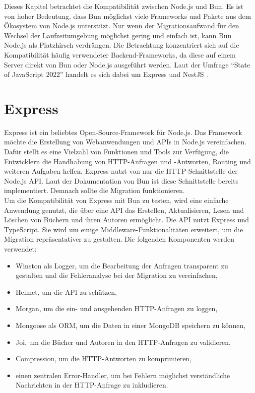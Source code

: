   \label{compabitility}
Dieses Kapitel betrachtet die Kompatibilität zwischen Node.js und Bun. Es ist von hoher Bedeutung, dass Bun möglichst viele Frameworks und Pakete aus dem Ökosystem von Node.js unterstüzt. Nur wenn der Migrationsaufwand für den Wechsel der Laufzeitumgebung möglichst gering und einfach ist, kann Bun Node.js als Platzhirsch verdrängen. Die Betrachtung konzentriert sich auf die Kompatibilität häufig verwendeter Backend-Frameworks, da diese auf einem Server direkt von Bun oder Node.js ausgeführt werden. Laut der Umfrage ``State of JavaScript 2022'' handelt es sich dabei um Express und NestJS \cite{Greif.2022}.

\section{Express} \label{sec:compabitility-newProjects}
Express ist ein beliebtes Open-Source-Framework für Node.js. Das Framework möchte die Erstellung von Webanwendungen und APIs in Node.js vereinfachen. Dafür stellt es eine Vielzahl von Funktionen und Tools zur Verfügung, die Entwicklern die Handhabung von HTTP-Anfragen und -Antworten, Routing und weiteren Aufgaben helfen. Express nutzt von nur die HTTP-Schnittstelle der Node.js API. Laut der Dokumentation von Bun ist diese Schnittstelle bereits implementiert. Demnach sollte die Migration funktionieren.\\

\noindent 
Um die Kompatibilität von Express mit Bun zu testen, wird eine einfache Anwendung genutzt, die über eine API das Erstellen, Aktualisieren, Lesen und Löschen von Büchern und ihren Autoren ermöglicht. Die API nutzt Express und TypeScript. Sie wird um einige Middleware-Funktionalitäten erweitert, um die Migration repräsentativer zu gestalten. Die folgenden Komponenten werden verwendet:
\begin{itemize}
	\item Winston als Logger, um die Bearbeitung der Anfragen transparent zu gestalten und die Fehleranalyse bei der Migration zu vereinfachen,
	\item Helmet, um die API zu schützen,
	\item Morgan, um die ein- und ausgehenden HTTP-Anfragen zu loggen,
	\item Mongoose als ORM, um die Daten in einer MongoDB speichern zu können,
	\item Joi, um die Bücher und Autoren in den HTTP-Anfragen zu validieren,
	\item Compression, um die HTTP-Antworten zu komprimieren,
	\item einen zentralen Error-Handler, um bei Fehlern möglichst verständliche Nachrichten in der HTTP-Anfrage zu inkludieren.
\end{itemize}
	
